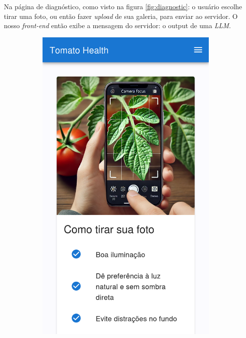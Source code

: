 Na página de diagnóstico, como visto na figura \ref{fig:diagnostic}: o usuário escolhe tirar uma foto, ou então fazer \textit{upload} de sua galeria, para enviar ao servidor. O nosso \textit{front-end} então exibe a mensagem do servidor: o output de uma \emph{LLM}.

\begin{figure}[htp]
    \centering
    \begin{subfigure}{0.3\textwidth}
        \centering
        \includegraphics[width=\linewidth, height=0.4\textheight, keepaspectratio]{images/diagnostic1.png}

\end{subfigure}
\end{figure}
